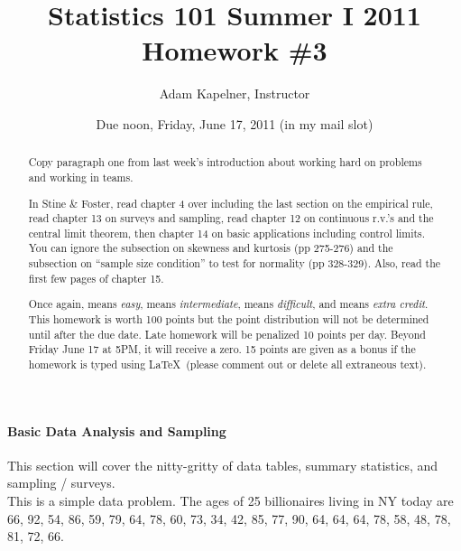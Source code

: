 \documentclass[12pt]{article}
\title{Statistics 101 Summer I 2011 \\ Homework \#3}
\author{Adam Kapelner, Instructor}
\date{Due noon, Friday, June 17, 2011 (in my mail slot)}
\begin{document}
\maketitle


\begin{abstract}
Copy paragraph one from last week's introduction about working hard on problems and working in teams.

In Stine \& Foster, read chapter 4 over including the last section on the empirical rule, read chapter 13 on surveys and sampling, read chapter 12 on continuous r.v.'s and the central limit theorem, then chapter 14 on basic applications including control limits. You can ignore the subsection on skewness and kurtosis (pp 275-276) and the subsection on ``sample size condition'' to test for normality (pp 328-329). Also, read the first few pages of chapter 15.

Once again,  means \textit{easy},  means \textit{intermediate},  means \textit{difficult}, and  means \textit{extra credit}. This homework is worth 100 points but the point distribution will not be determined until after the due date. Late homework will be penalized 10 points per day. Beyond Friday June 17 at 5PM, it will receive a zero. 15 points are given as a bonus if the homework is typed using \LaTeX ~(please comment out or delete all extraneous text).
\end{abstract}


\paragraph{Basic Data Analysis and Sampling} This section will cover the nitty-gritty of data tables, summary statistics, and sampling / surveys. \\

\problem This is a simple data problem. The ages of 25 billionaires living in NY today are 66, 92, 54, 86, 59, 79, 64, 78, 60, 73, 34, 42, 85, 77, 90, 64, 64, 64, 78, 58, 48, 78, 81, 72, 66.
\end{document}
